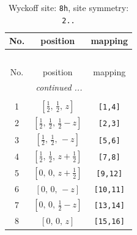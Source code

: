 \documentclass[fleqn,8pt]{jsarticle}
\begin{document}
\begin{longtable}{ccc}
\caption{Wyckoff site: {\tt 8h}, site symmetry: {\tt 2..}}
 \\
 \hline \hline
No. & position & mapping \\ \hline \endfirsthead

\multicolumn{2}{l}{\tablename\ \thetable{}} \\
 \hline \hline
No. & position & mapping \\ \hline \endhead

 \hline \hline
\multicolumn{2}{r}{\footnotesize\it continued ...} \\ \endfoot

 \hline \hline
\multicolumn{2}{r}{} \\ \endlastfoot

1 & $\left[ \frac{1}{2},\, \frac{1}{2},\, z \right]$ & {\tt [1,4]} \\ \hline
2 & $\left[ \frac{1}{2},\, \frac{1}{2},\, \frac{1}{2} - z \right]$ & {\tt [2,3]} \\ \hline
3 & $\left[ \frac{1}{2},\, \frac{1}{2},\, - z \right]$ & {\tt [5,6]} \\ \hline
4 & $\left[ \frac{1}{2},\, \frac{1}{2},\, z + \frac{1}{2} \right]$ & {\tt [7,8]} \\ \hline
5 & $\left[ 0,\, 0,\, z + \frac{1}{2} \right]$ & {\tt [9,12]} \\ \hline
6 & $\left[ 0,\, 0,\, - z \right]$ & {\tt [10,11]} \\ \hline
7 & $\left[ 0,\, 0,\, \frac{1}{2} - z \right]$ & {\tt [13,14]} \\ \hline
8 & $\left[ 0,\, 0,\, z \right]$ & {\tt [15,16]} \\
\end{longtable}
\renewcommand{\arraystretch}{1.2}
\end{document}
